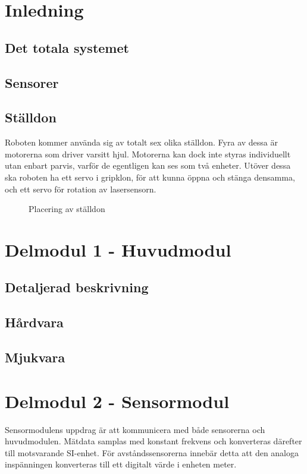 \documentclass[11pt]{article}
\begin{document}
\begin{flushleft}
\section{Inledning}
\lipsum

\subsection{Det totala systemet}
\lipsum

\subsection{Sensorer}
\lipsum

\subsection{Ställdon}
Roboten kommer använda sig av totalt sex olika ställdon. Fyra av dessa är motorerna som driver varsitt hjul. Motorerna kan dock inte styras individuellt utan enbart parvis, varför de egentligen kan ses som två enheter. Utöver dessa ska roboten ha ett servo i gripklon, för att kunna öppna och stänga densamma, och ett servo för rotation av lasersensorn.
\begin{figure}[htbp]
\centering
\noindent\resizebox{.8\linewidth}{!}{
	}
	\caption{Placering av ställdon \label{ställdon}}	
\end{figure}

\pagebreak
\section{Delmodul 1 - Huvudmodul}
\lipsum

\subsection{Detaljerad beskrivning}
\lipsum

\subsection{Hårdvara}
\lipsum

\subsection{Mjukvara}
\lipsum

\pagebreak
\section{Delmodul 2 - Sensormodul}
Sensormodulens uppdrag är att kommunicera med både sensorerna och huvudmodulen. Mätdata samplas med konstant frekvens och konverteras därefter till motsvarande SI-enhet. För avståndssensorerna innebär detta att den analoga inspänningen konverteras till ett digitalt värde i enheten meter.


\end{flushleft}
\end{document}
